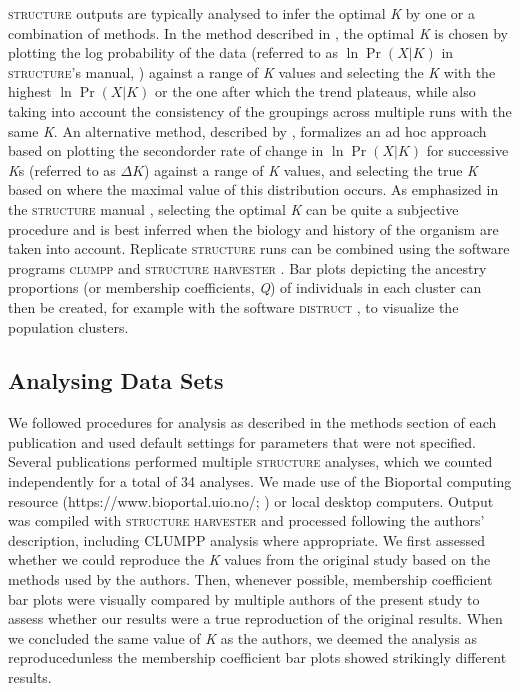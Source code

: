 \textsc{structure} outputs are typically analysed to infer the optimal \emph{K} by one 
or a combination of methods. In the method described in \citet{Pritchard:2000}, the 
optimal \emph{K} is chosen by plotting the log probability of the data (referred to as 
$\ln \Pr(X|K)$ in \textsc{structure}'s manual, \citealt{Pritchard:2007}) against a range of \emph{K} 
values and selecting the \emph{K} with the highest $\ln \Pr(X|K)$ or the one after which the 
trend plateaus, while also taking into account the consistency of the groupings across 
multiple runs with the same \emph{K}. An alternative method, described by \citet{Evanno:2005}, 
formalizes an ad hoc approach based on plotting the secondorder rate of change in $\ln \Pr(X|K)$ 
for successive \emph{K}s (referred to as $\Delta K$) against a range of \emph{K} values, and selecting 
the true \emph{K} based on where the maximal value of this distribution occurs. As 
emphasized in the \textsc{structure} manual \citep{Pritchard:2007}, selecting the optimal 
\emph{K} can be quite a subjective procedure and is best inferred when the biology and 
history of the organism are taken into account. Replicate \textsc{structure} runs can be 
combined using the software programs \textsc{clumpp} \citep{Jakobsson:2007} and 
\textsc{structure harvester} \citep{Earl:2012}. Bar plots depicting the ancestry 
proportions (or membership coefficients, \emph{Q}) of individuals in each cluster can then be 
created, for example with the software \textsc{distruct} \citep{Rosenberg:2004}, to visualize the population clusters.

\subsection{Analysing Data Sets}
We followed procedures for analysis as described in the methods section of each publication 
and used default settings for parameters that were not specified. Several publications 
performed multiple \textsc{structure} analyses, which we counted independently for a total 
of 34 analyses. We made use of the Bioportal computing resource (https://www.bioportal.uio.no/; \citealt{Kumar:2009}) 
or local desktop computers. Output was compiled with \textsc{structure harvester} and processed 
following the authors' description, including CLUMPP analysis where appropriate. We first assessed 
whether we could reproduce the \emph{K} values from the original study based on the methods used by 
the authors. Then, whenever possible, membership coefficient bar plots were visually compared by 
multiple authors of the present study to assess whether our results were a true reproduction of 
the original results. When we concluded the same value of \emph{K} as the authors, we deemed the 
analysis as reproducedunless the membership coefficient bar plots showed strikingly different results.

